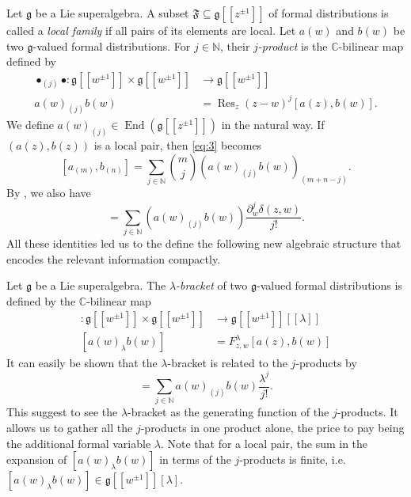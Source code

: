 \documentclass[a4paper, 12pt, reqno]{amsart}
\theoremstyle{remark}
\numberwithin{equation}{subsection}
\DeclareMathOperator{\End}{End}
\DeclareMathOperator{\Res}{Res}
\begin{document}
Let $\mathfrak{g}$ be a Lie superalgebra.
A subset $\mathfrak{F} \subseteq \mathfrak{g}[[z^{\pm 1}]]$ of formal distributions is called a \emph{local family} if all pairs of its elements are local.
Let $a(w)$ and $b(w)$ be two $\mathfrak{g}$-valued formal distributions.
For $j \in \mathbb{N}$, their \emph{$j$-product} is the $\mathbb{C}$-bilinear map defined by
\begin{align}
  \nonumber
  \bullet_{(j)}\bullet: \mathfrak{g}[[w^{\pm 1}]] \times \mathfrak{g}[[w^{\pm 1}]] &\to \mathfrak{g}[[w^{\pm 1}]]\\
  \label{eq:4}
  a(w)_{(j)}b(w) &= \Res_z(z - w)^j[a(z), b(w)].
\end{align}
We define $a(w)_{(j)} \in \End(\mathfrak{g}[[z^{\pm 1}]])$ in the natural way.
If $(a(z), b(z))$ is a local pair, then \eqref{eq:3} becomes
\begin{equation}
  \label{eq:5}
  [a_{(m)}, b_{(n)}] = \sum_{j \in \mathbb{N}}\binom{m}{j}(a(w)_{(j)}b(w))_{(m + n - j)}.
\end{equation}
By , we also have
\begin{equation*}
  [a(z),b(w)]=\sum_{j\in \mathbb{N}}(a(w)_{(j)}b(w))\frac{\partial_w^j\delta(z,w)}{j!}.
\end{equation*}
All these identities led us to the define the following new algebraic structure that encodes the relevant information compactly.

Let $\mathfrak{g}$ be a Lie superalgebra.
The \emph{$\lambda$-bracket} of two $\mathfrak{g}$-valued formal distributions is defined by the $\mathbb{C}$-bilinear map
\begin{align*}
  [\bullet_{\lambda}\bullet]: \mathfrak{g}[[w^{\pm 1}]] \times \mathfrak{g}[[w^{\pm 1}]] &\to \mathfrak{g}[[w^{\pm 1}]][[\lambda]] \\
  [a(w)_{\lambda}b(w)] &= F^{\lambda}_{z, w}[a(z), b(w)]
\end{align*}
It can easily be shown that the $\lambda$-bracket is related to the $j$-products by
\begin{equation*}
  [a(w)_{\lambda}b(w)] = \sum_{j \in \mathbb{N}}a(w)_{(j)}b(w)\frac{\lambda^j}{j!}.
\end{equation*}
This suggest to see the $\lambda$-bracket as the generating function of the $j$-products.
It allows us to gather all the $j$-products in one product alone, the price to pay being the additional formal variable $\lambda$.
Note that for a local pair, the sum in the expansion of $[a(w)_{\lambda} b(w)]$ in terms of the $j$-products is finite, i.e.\ $[a(w)_{\lambda}b(w)] \in \mathfrak{g}[[w^{\pm 1}]][\lambda]$.
\end{document}
